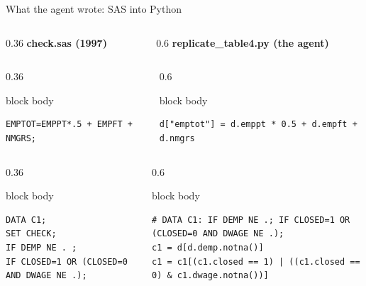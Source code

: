 \documentclass[aspectratio=169,11pt]{beamer}
\begin{document}
\begin{frame}[fragile]{What the agent wrote: SAS into Python}
\fontsize{6.6}{7.8}\selectfont
\begin{columns}[T]
\begin{column}{0.36\textwidth}
\textbf{\normalsize check.sas (1997)}
\end{column}
\begin{column}{0.6\textwidth}
\textbf{\normalsize replicate\_table4.py (the agent)}
\end{column}
\end{columns}
\vspace{0.2em}
\begin{columns}[T]
\begin{column}{0.36\textwidth}
\begin{beamercolorbox}[sep=3pt]{block body}
\begin{verbatim}
EMPTOT=EMPPT*.5 + EMPFT + NMGRS;
\end{verbatim}
\end{beamercolorbox}
\end{column}
\begin{column}{0.6\textwidth}
\begin{beamercolorbox}[sep=3pt]{block body}
\begin{verbatim}
d["emptot"] = d.emppt * 0.5 + d.empft + d.nmgrs
\end{verbatim}
\end{beamercolorbox}
\end{column}
\end{columns}
\vspace{0.2em}
\begin{columns}[T]
\begin{column}{0.36\textwidth}
\begin{beamercolorbox}[sep=3pt]{block body}
\begin{verbatim}
DATA C1;
SET CHECK;
IF DEMP NE . ;
IF CLOSED=1 OR (CLOSED=0 AND DWAGE NE .);
\end{verbatim}
\end{beamercolorbox}
\end{column}
\begin{column}{0.6\textwidth}
\begin{beamercolorbox}[sep=3pt]{block body}
\begin{verbatim}
# DATA C1: IF DEMP NE .; IF CLOSED=1 OR (CLOSED=0 AND DWAGE NE .);
c1 = d[d.demp.notna()]
c1 = c1[(c1.closed == 1) | ((c1.closed == 0) & c1.dwage.notna())]
\end{verbatim}
\end{beamercolorbox}

\end{column}
\end{columns}
\end{frame}
\end{document}
